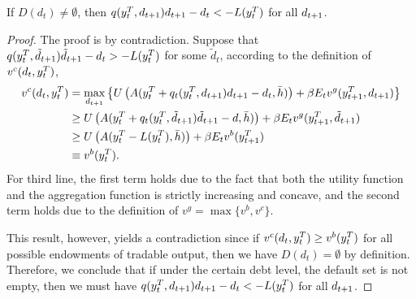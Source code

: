 \begin{proposition}
    \label{prop1}
    If $D(d_t) \neq \emptyset$, then $q(y^T_{t}, d_{t+1})d_{t+1} - d_t < -L(y^T_{t})$ for all $d_{t+1}$.
\end{proposition}
\begin{proof}
    The proof is by contradiction. Suppose that $q(y^T_{t}, \tilde{d}_{t+1})\tilde{d}_{t+1} - d_t > -L(y^T_{t})$ for some $\tilde{d}_t$, according to the definition of $v^c(d_t, y^T_{t})$,
    \begin{align*}
        v^c(d_t, y^T_{t}) &= \max_{d_{t+1}} \left\{
            U\left( A(y^T_{t} + q_t(y^T_{t}, d_{t+1}) d_{t+1} - d_t, \bar{h}) \right) +
            \beta E_t v^g(y^T_{t+1}, d_{t+1})
         \right\}\\
         &\ge U\left( A(y^T_{t} + q_t(y^T_{t}, \tilde{d}_{t+1}) \tilde{d}_{t+1} - d, \bar{h}) \right) +
            \beta E_t v^g(y^T_{t+1}, \tilde{d}_{t+1}) \\
         &\ge U\left( A(y^T_{t} -L(y^T_{t}), \bar{h}) \right) +
            \beta E_t v^b(y^T_{t+1}) \\
        &\equiv v^b(y^T_{t}).
    \end{align*}
    For third line, the first term holds due to the fact that both the utility function and the aggregation function is strictly increasing and concave, and the second term holds due to the definition of  $v^g = \max\{v^b, v^c\}$.

    This result, however, yields a contradiction since if $v^c(d_t, y^T_{t}) \ge v^b(y^T_{t})$ for all possible endowments of tradable output, then we have $D(d_t) = \emptyset$ by definition. Therefore, we conclude that if under the certain debt level, the default set is not empty, then we must have $q(y^T_{t}, d_{t+1})d_{t+1} - d_t < -L(y^T_{t})$ for all $d_{t+1}$.
\end{proof}

